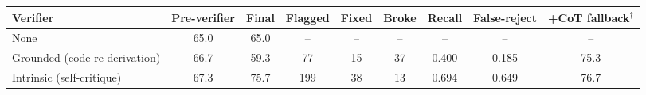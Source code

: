 \begin{tabular}{lcccccccc}
\toprule
Verifier & Pre-verifier & Final & Flagged & Fixed & Broke & Recall & False-reject & +CoT fallback$^\dagger$ \\
\midrule
None & 65.0 & 65.0 & -- & -- & -- & -- & -- & -- \\
Grounded (code re-derivation) & 66.7 & 59.3 & 77 & 15 & 37 & 0.400 & 0.185 & 75.3 \\
Intrinsic (self-critique) & 67.3 & 75.7 & 199 & 38 & 13 & 0.694 & 0.649 & 76.7 \\
\bottomrule
\end{tabular}
